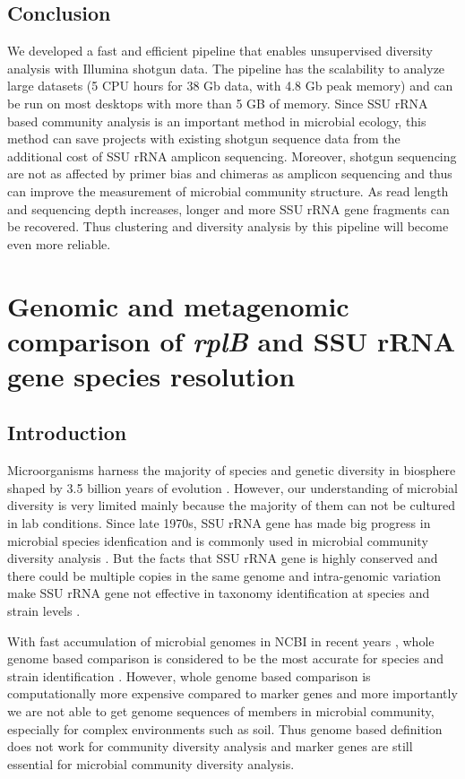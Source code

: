 \documentclass[]{msu-thesis}
\begin{document}
\section{Conclusion}

We developed a fast and efficient pipeline that enables unsupervised diversity analysis with Illumina shotgun data. The pipeline has the scalability to analyze large datasets (5 CPU hours for 38 Gb data, with 4.8 Gb peak memory) and can be run on most desktops with more than 5 GB of memory. Since SSU rRNA based community analysis is an important method in microbial ecology, this method can save projects with existing shotgun sequence data from the additional cost of SSU rRNA amplicon sequencing. Moreover, shotgun sequencing are not as affected by primer bias and chimeras as amplicon sequencing and thus can improve the measurement of microbial community structure. As read length and sequencing depth increases, longer and more SSU rRNA gene fragments can be recovered. Thus clustering and diversity analysis by this pipeline will become even more reliable.


\chapter{Genomic and metagenomic comparison of \textit{rplB} and SSU rRNA gene species resolution}

\section{Introduction}

Microorganisms harness the majority of species and genetic diversity in biosphere shaped by 3.5 billion years of evolution \cite{locey_scaling_2016}. However, our understanding of microbial diversity is very limited mainly because the majority of them can not be cultured in lab conditions. Since late 1970s, SSU rRNA gene has made big progress in microbial species idenfication and is commonly used in microbial community diversity analysis \cite{woese_phylogenetic_1977,lane_rapid_1985,huse_exploring_2008,caporaso_ultra-high-throughput_2012}. But the facts that SSU rRNA gene is highly conserved and there could be multiple copies in the same genome and intra-genomic variation make SSU rRNA gene not effective in taxonomy identification at species and strain levels \cite{case_use_2007,roux_comparison_2011,wu_simple_2008}.

With fast accumulation of microbial genomes in NCBI in recent years \cite{land_insights_2015}, whole genome based comparison is considered to be the most accurate for species and strain identification \cite{goris_dna-dna_2007,luo_genome_2011,varghese_microbial_2015}. However, whole genome based comparison is computationally more expensive compared to marker genes and more importantly we are not able to get genome sequences of members in microbial community, especially for complex environments such as soil. Thus genome based definition does not work for community diversity analysis and marker genes are still essential for microbial community diversity analysis.
\end{document}
